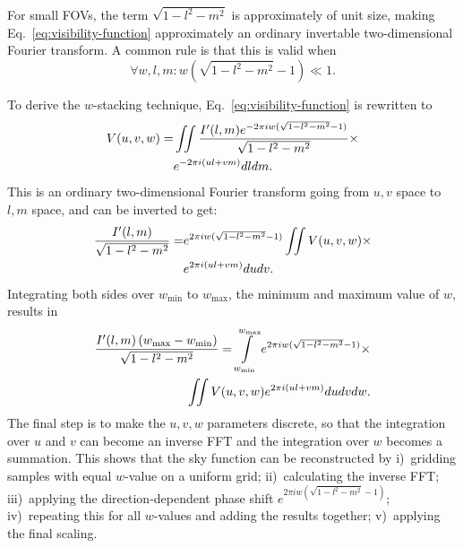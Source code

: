 \documentclass[useAMS,usenatbib]{mn2e}
\begin{document}
For small FOVs, the term $\sqrt{1-l^2-m^2}$ is approximately of unit size, making Eq.~\eqref{eq:visibility-function} approximately an ordinary invertable two-dimensional Fourier transform. A common rule is that this is valid when
\begin{equation}\label{eq:when-2d-is-valid}
\forall w,l,m: w\left(\sqrt{1-l^2-m^2}-1\right) \ll 1.
\end{equation}

To derive the $w$-stacking technique, Eq.~\eqref{eq:visibility-function} is rewritten to
\begin{align}\notag
V(u,v,w) = & \iint \frac{I'(l,m) e^{-2\pi i w(\sqrt{1-l^2-m^2}-1)}}{\sqrt{1-l^2-m^2}} \times \\ \notag
& e^{-2\pi i \left(ul + vm\right)} dl dm.
\end{align}
This is an ordinary two-dimensional Fourier transform going from $u,v$ space to $l,m$ space, and can be inverted to get:
\begin{align}\notag
\frac{I'(l,m)}{\sqrt{1-l^2-m^2}} = & e^{2\pi i w(\sqrt{1-l^2-m^2}-1)} \iint V(u,v,w) \times \\ \notag
& e^{2\pi i \left(ul + vm\right)} du dv.
\end{align}
Integrating both sides over $w_{\min}$ to $w_{\max}$, the minimum and maximum value of $w$, results in
\begin{align}\notag
\frac{I'(l,m)\left(w_{\max} - w_{\min}\right)}{\sqrt{1-l^2-m^2}} = \int\limits_{w_{\min}}^{w_{\max}} e^{2\pi i w(\sqrt{1-l^2-m^2}-1)} \times \\ \label{eq:wstacking}
\iint V(u,v,w)  e^{2\pi i \left(ul + vm\right)} du dv dw.
\end{align}
The final step is to make the $u,v,w$ parameters discrete, so that the integration over $u$ and $v$ can become an inverse FFT and the integration over $w$ becomes a summation. This shows that the sky function can be reconstructed by i)~gridding samples with equal $w$-value on a uniform grid; ii)~calculating the inverse FFT; iii)~applying the direction-dependent phase shift $e^{2\pi i w(\sqrt{1-l^2-m^2}-1)}$; iv)~repeating this for all $w$-values and adding the results together; v)~applying the final scaling.
\end{document}
